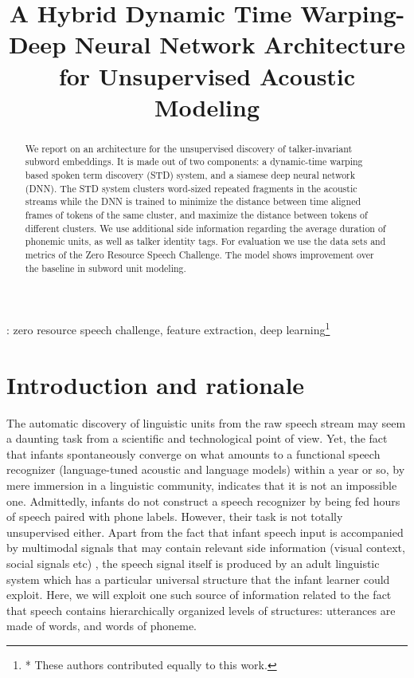 \documentclass[a4paper]{article}
\title{A Hybrid Dynamic Time Warping-Deep Neural Network Architecture for Unsupervised Acoustic Modeling}
\begin{document}
\maketitle

\begin{abstract}
We report on an architecture for the unsupervised discovery of talker-invariant subword embeddings. It is made out of two components: a dynamic-time warping based spoken term discovery (STD) system, and a siamese deep neural network (DNN). The STD system clusters word-sized repeated fragments in the acoustic streams while the DNN is trained to minimize the distance between time aligned frames of tokens of the same cluster, and maximize the distance between tokens of different clusters. We use additional side information regarding the average duration of phonemic units, as well as talker identity tags. For evaluation we use the data sets and metrics of the Zero Resource Speech Challenge. The model shows improvement over the baseline in subword unit modeling.
\end{abstract}
: zero resource speech challenge, feature extraction, deep learning\let\thefootnote\relax\footnote{* These authors contributed equally to this work.}


\section{Introduction and rationale}
The automatic discovery of linguistic units from the raw speech stream \cite{} may seem a daunting task from a scientific and technological point of view. Yet, the fact that infants spontaneously converge on what amounts to a functional speech recognizer (language-tuned acoustic and language models) within a year or so, by mere immersion in a linguistic community, indicates that it is not an impossible one. Admittedly, infants do not construct a speech recognizer by being fed hours of speech paired with phone labels. However, their task is not totally unsupervised either. Apart from the fact that infant speech input is accompanied by multimodal signals that may contain relevant side information (visual context, social signals etc) , the speech signal itself is produced by an adult linguistic system which has a particular universal structure  that the infant learner could exploit. Here, we will exploit one  such source of information related to the fact that speech contains hierarchically organized levels of structures: utterances are made of words, and words of phoneme.
\end{document}

